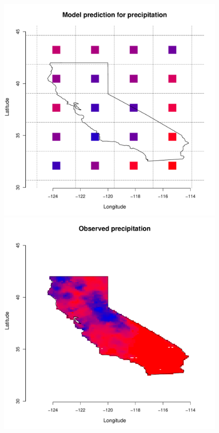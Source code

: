 \begin{figure}
\begin{center}
\includegraphics[scale=0.26]{figs/cal_mod_box1.pdf}
\includegraphics[scale=0.26]{figs/cal_mod_box2.pdf}

\end{center}
\end{figure}
